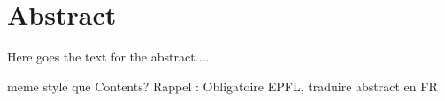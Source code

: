 \chapter*{Abstract}

Here goes the text for the abstract....

meme style que Contents? Rappel : Obligatoire EPFL, traduire abstract en FR

\newpage
